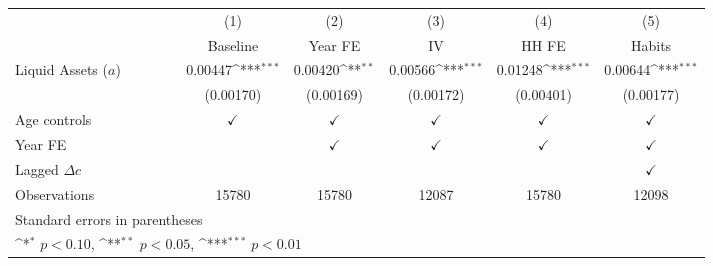 {
\def\sym#1{\ifmmode^{#1}\else\(^{#1}\)\fi}
\begin{longtable}{l*{5}{c}}
\toprule\endfirsthead\midrule\endhead\midrule\endfoot\endlastfoot
                    &\multicolumn{1}{c}{(1)}&\multicolumn{1}{c}{(2)}&\multicolumn{1}{c}{(3)}&\multicolumn{1}{c}{(4)}&\multicolumn{1}{c}{(5)}\\
                    &\multicolumn{1}{c}{Baseline}&\multicolumn{1}{c}{Year FE}&\multicolumn{1}{c}{IV}&\multicolumn{1}{c}{HH FE}&\multicolumn{1}{c}{Habits}\\
\midrule
Liquid Assets ($ a $) $\;\;\;\;\;\;\;\;\;\;\;\;$&     0.00447\sym{***}&     0.00420\sym{**} &     0.00566\sym{***}&     0.01248\sym{***}&     0.00644\sym{***}\\
                    &   (0.00170)         &   (0.00169)         &   (0.00172)         &   (0.00401)         &   (0.00177)         \\
\addlinespace
Age controls        &$\checkmark$         &$\checkmark$         &$\checkmark$         &$\checkmark$         &$\checkmark$         \\
\addlinespace
Year FE             &                     &$\checkmark$         &$\checkmark$         &$\checkmark$         &$\checkmark$         \\
\addlinespace
Lagged $\Delta c$   &                     &                     &                     &                     &$\checkmark$         \\
\midrule
Observations        &       15780         &       15780         &       12087         &       15780         &       12098         \\
\bottomrule
\multicolumn{6}{l}{\footnotesize Standard errors in parentheses}\\
\multicolumn{6}{l}{\footnotesize \sym{*} \(p<0.10\), \sym{**} \(p<0.05\), \sym{***} \(p<0.01\)}\\
\end{longtable}
}
